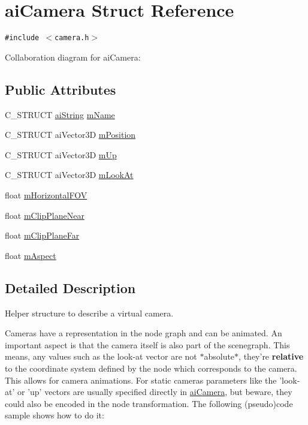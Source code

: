 \hypertarget{structai_camera}{
\section{aiCamera Struct Reference}
\label{structai_camera}
}
{\tt \#include $<$camera.h$>$}

Collaboration diagram for aiCamera:\subsection*{Public Attributes}
\begin{CompactItemize}
\item 
C\_\-STRUCT \hyperlink{structai_string}{aiString} \hyperlink{structai_camera_a6a5fe5e04b3db1b23f69eb9910c6816}{mName}
\item 
C\_\-STRUCT aiVector3D \hyperlink{structai_camera_518617ea192ca0698e748a4399e7c3a5}{mPosition}
\item 
C\_\-STRUCT aiVector3D \hyperlink{structai_camera_7fb42b287389b4f99c883098268d6d1a}{mUp}
\item 
C\_\-STRUCT aiVector3D \hyperlink{structai_camera_f9463249ac870e030fa435b1186cef23}{mLookAt}
\item 
float \hyperlink{structai_camera_dcdea73ece19ea0a9068f5544ec23592}{mHorizontalFOV}
\item 
float \hyperlink{structai_camera_720e8c94c036dcefe4b13cc1c69c521e}{mClipPlaneNear}
\item 
float \hyperlink{structai_camera_a9ccf77e3d7ca3dc8f46df931b65172f}{mClipPlaneFar}
\item 
float \hyperlink{structai_camera_e414556eaa6f910b5927f465d97bf70c}{mAspect}
\end{CompactItemize}


\subsection{Detailed Description}
Helper structure to describe a virtual camera.

Cameras have a representation in the node graph and can be animated. An important aspect is that the camera itself is also part of the scenegraph. This means, any values such as the look-at vector are not $\ast$absolute$\ast$, they're {\bf relative} to the coordinate system defined by the node which corresponds to the camera. This allows for camera animations. For static cameras parameters like the 'look-at' or 'up' vectors are usually specified directly in \hyperlink{structai_camera}{aiCamera}, but beware, they could also be encoded in the node transformation. The following (pseudo)code sample shows how to do it: \par
\par
 

